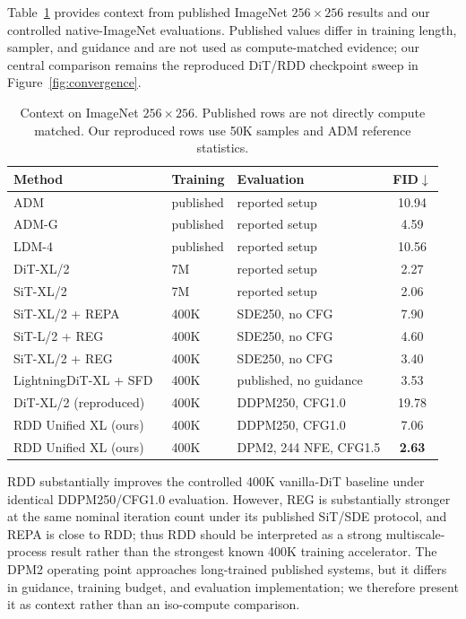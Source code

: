 \documentclass[10pt]{article}
\begin{document}
Table~\ref{tab:published} provides context from published ImageNet $256\times256$ results and our controlled native-ImageNet evaluations.
Published values differ in training length, sampler, and guidance and are not used as compute-matched evidence; our central comparison remains the reproduced DiT/RDD checkpoint sweep in Figure~\ref{fig:convergence}.

\begin{table}[t]
\centering
\caption{Context on ImageNet $256\times256$. Published rows are not directly compute matched. Our reproduced rows use 50K samples and ADM reference statistics.}
\label{tab:published}
\begin{tabular}{@{}lllc@{}}
\toprule
\textbf{Method} & \textbf{Training} & \textbf{Evaluation} & \textbf{FID}$\downarrow$ \\
\midrule
ADM~\citep{dhariwal2021adm} & published & reported setup & 10.94 \\
ADM-G~\citep{dhariwal2021adm} & published & reported setup & 4.59 \\
LDM-4~\citep{rombach2022ldm} & published & reported setup & 10.56 \\
DiT-XL/2~\citep{peebles2023dit} & 7M & reported setup & 2.27 \\
SiT-XL/2~\citep{ma2024sit} & 7M & reported setup & 2.06 \\
SiT-XL/2 + REPA~\citep{yu2025repa} & 400K & SDE250, no CFG & 7.90 \\
SiT-L/2 + REG~\citep{wu2025reg} & 400K & SDE250, no CFG & 4.60 \\
SiT-XL/2 + REG~\citep{wu2025reg} & 400K & SDE250, no CFG & 3.40 \\
LightningDiT-XL + SFD~\citep{pan2026sfd} & 400K & published, no guidance & 3.53 \\
\midrule
DiT-XL/2 (reproduced) & 400K & DDPM250, CFG1.0 & 19.78 \\
RDD Unified XL (ours) & 400K & DDPM250, CFG1.0 & 7.06 \\
RDD Unified XL (ours) & 400K & DPM2, 244 NFE, CFG1.5 & \textbf{2.63} \\
\bottomrule
\end{tabular}
\end{table}

RDD substantially improves the controlled 400K vanilla-DiT baseline under identical DDPM250/CFG1.0 evaluation. However, REG is substantially stronger at the same nominal iteration count under its published SiT/SDE protocol, and REPA is close to RDD; thus RDD should be interpreted as a strong multiscale-process result rather than the strongest known 400K training accelerator.
The DPM2 operating point approaches long-trained published systems, but it differs in guidance, training budget, and evaluation implementation; we therefore present it as context rather than an iso-compute comparison.
\end{document}
